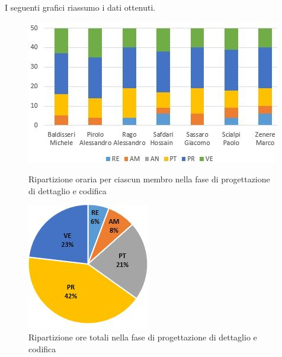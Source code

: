 I seguenti grafici riassumo i dati ottenuti.

\begin{figure}[!htb]
   \begin{minipage}{0.6\textwidth}
     \centering
     \includegraphics{Images/PO-Codifica}
     \caption{Ripartizione oraria per ciascun membro nella fase di progettazione di dettaglio e codifica}
   \end{minipage}\hspace{0.1\textwidth}
   \begin{minipage}{0.3\textwidth}
     \centering
     \includegraphics[width=.9\textwidth]{Images/PE-Codifica}
     \captionsetup{width=1.1\textwidth}
     \caption{Ripartizione ore totali nella fase di progettazione di dettaglio e codifica}
   \end{minipage}
\end{figure}

\newpage